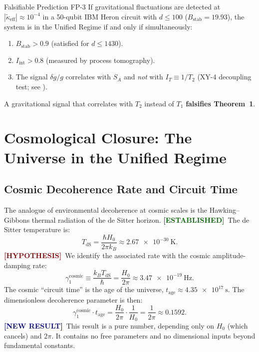 \documentclass[12pt,a4paper]{article}
\newcommand{\EST}{\textcolor{darkgreen}{\textbf{[ESTABLISHED]}}}
\newcommand{\HYP}{\textcolor{darkred}{\textbf{[HYPOTHESIS]}}}
\newcommand{\NEW}{\textcolor{darkblue}{\textbf{[NEW RESULT]}}}
\theoremstyle{monette}
\theoremstyle{definition}
\newcommand{\SA}{S_A}
\newcommand{\keff}{\tilde{\kappa}_{\mathrm{eff}}}
\newcommand{\Bstab}{B_{\mathrm{stab}}}
\newcommand{\gamone}{\gamma_1}
\newcommand{\Tone}{T_1}
\begin{document}
\begin{predbox}{Falsifiable Prediction FP-3}
If gravitational fluctuations are detected at $|\keff| \approx 10^{-4}$
in a 50-qubit IBM Heron circuit with $d \leq 100$ ($\Bstab = 19.93$),
the system is in the Unified Regime if and only if simultaneously:
\begin{enumerate}[nosep]
  \item $\Bstab > 0.9$ (satisfied for $d \leq 1430$).
  \item $I_{\mathrm{int}} > 0.8$ (measured by process tomography).
  \item The signal $\delta g/g$ correlates with $\SA$ and \emph{not} with
        $I_T \equiv 1/T_2$ (XY-4 decoupling test; see ).
\end{enumerate}
A gravitational signal that correlates with $T_2$ instead of $\Tone$
\textbf{falsifies Theorem~1}.
\end{predbox}

\section{Cosmological Closure: The Universe in the Unified Regime}
\label{sec:cosmology}

\subsection{Cosmic Decoherence Rate and Circuit Time}
\label{sec:cosmic_rate}

The analogue of environmental decoherence at cosmic scales is the
Hawking--Gibbons thermal radiation of the de Sitter horizon.
\EST\ The de Sitter temperature is:
\begin{equation}
  T_{\mathrm{dS}} = \frac{\hbar H_0}{2\pi k_B}
    \approx \SI{2.67e-30}{\kelvin}.
  \label{eq:TdS}
\end{equation}
\HYP\ We identify the associated rate with the cosmic amplitude-damping rate:
\begin{equation}
  \gamone^{\mathrm{cosmic}} \equiv \frac{k_B T_{\mathrm{dS}}}{\hbar}
    = \frac{H_0}{2\pi} \approx \SI{3.47e-19}{\hertz}.
  \label{eq:gamma1_cosmic}
\end{equation}
The cosmic ``circuit time'' is the age of the universe,
$t_{\mathrm{age}} \approx \SI{4.35e17}{\second}$.
The dimensionless decoherence parameter is then:
\begin{equation}
  \gamone^{\mathrm{cosmic}} \cdot t_{\mathrm{age}}
    = \frac{H_0}{2\pi} \cdot \frac{1}{H_0}
    = \frac{1}{2\pi}
    \approx 0.1592.
  \label{eq:cosmic_gt}
\end{equation}
\NEW\ This result is a pure number, depending only on
$H_0$ (which cancels) and $2\pi$.
It contains no free parameters and no dimensional inputs beyond
fundamental constants.
\end{document}
